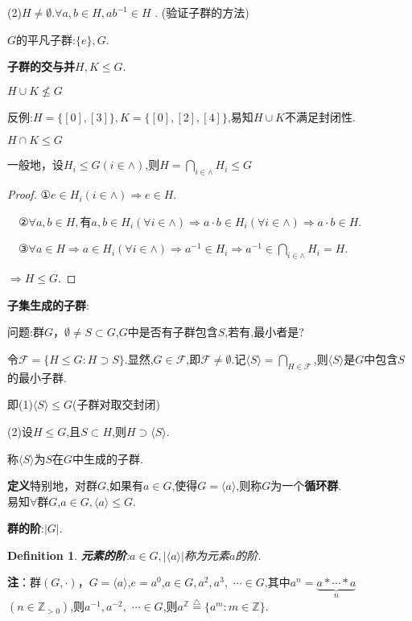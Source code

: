 \documentclass[UTF8]{article}
\newtheorem{defn}{Definition}[section]
\begin{document}
(2)$H\ne\emptyset.\forall a,b\in H,ab^{-1}\in H$ . (验证子群的方法)

$G$的平凡子群:$\{e\},G$.

\textbf{子群的交与并}\quad$H,K\le G.$

$H\cup K\nleq G$

反例:$H=\{[0],[3]\},K=\{[0],[2],[4]\}$,易知$H\cup K$不满足封闭性.

$H\cap K\le G$

一般地，设$H_i\le G(i\in\land)$,则$H=\bigcap_{i\in\land}H_i\le G$
\begin{proof}
	①$e\in H_i(i\in\land)\Rightarrow e\in H.$
	
	$\quad$②$\forall a,b\in H,$有$a,b\in H_i(\forall i\in\land)\Rightarrow a\cdot b\in H_i(\forall i\in\land)\Rightarrow a\cdot b\in H$.
	
	$\quad$③$\forall a\in H\Rightarrow a\in H_i(\forall i\in\land)\Rightarrow a^{-1}\in H_i\Rightarrow a^{-1}\in\bigcap_{i\in\land}H_i=H$.
	
	$\Longrightarrow H\le G.$
\end{proof}

\textbf{子集生成的子群}:

问题:群$G$，$\emptyset\ne S\subset G$,$G$中是否有子群包含$S$,若有,最小者是?

令$\mathscr{F}=\{H\le G:H\supset S\}$.显然,$G\in \mathscr{F}$,即$\mathscr{F}\ne\emptyset$.记$\langle S\rangle=\bigcap_{H\in\mathscr{F}}$,则$\langle S\rangle$是$G$中包含$S$的最小子群.

即(1)$\langle S\rangle\le G$(子群对取交封闭)

(2)设$H\le G$,且$S\subset H$,则$H\supset \langle S\rangle$.

称$\langle S\rangle$为$S$在$G$中生成的子群.

\textbf{定义}\quad 特别地，对群$G$,如果有$a\in G$,使得$G=\langle a\rangle$,则称$G$为一个\textbf{循环群}.
\\易知$\forall$群$G$,$a\in G,\langle a\rangle\le G.$

\textbf{群的阶}:$|G|$.

\begin{defn}
	\textbf{元素的阶}:$a\in G,|\langle a\rangle|$称为元素$a$的阶.
\end{defn}

\textbf{注}：群$(G,\cdot)$，$G=\langle a\rangle$,$e=a^0$,$a\in G,a^2,a^3,$
$\cdots\in G$,其中$a^n=\underbrace{a*\cdots*a}_{n}$$(n\in \mathbb{Z}_{{>}{0}})$,则${a}^{-1},{a}^{-2},$
$\cdots\in G$,则$a^\mathbb{Z}\stackrel{\bigtriangleup}{=}\{a^m:m\in\mathbb{Z}\}$.
\end{document}
